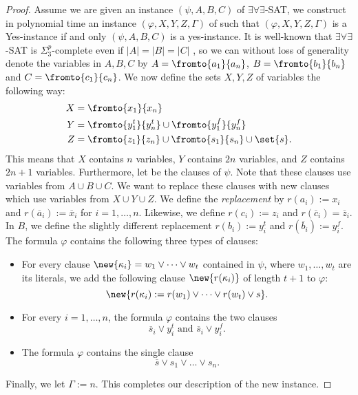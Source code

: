 \documentclass[a4paper,abstracton]{scrartcl}
\begin{document}
\begin{proof}
Assume we are given an instance $(\psi,A,B,C)$ of $\exists\forall\exists$-SAT, we construct in polynomial time an instance $(\varphi,X,Y,Z,\Gamma)$ of {\radj} such that $(\varphi,X,Y,Z,\Gamma)$ is a Yes-instance if and only  $(\psi,A,B,C)$ is a yes-instance. 
It is well-known \cite{schaefer2002completeness} that $\exists\forall\exists$-SAT is $\Sigma_3^p$-complete even if $|A| = |B| = |C|$ , so we can without loss of generality denote the variables in $A,B,C$ by $A = \fromto{a_1}{a_n}$, $B = \fromto{b_1}{b_n}$ and $C = \fromto{c_1}{c_n}$. 
We now define the sets $X,Y,Z$ of variables the following way:
\begin{align*}
X &= \fromto{x_1}{x_n}\\
Y &= \fromto{y^t_1}{y^t_n} \cup \fromto{y^f_1}{y^f_n}\\
Z &= \fromto{z_1}{z_n} \cup \fromto{s_1}{s_n} \cup \set{s}.
\end{align*}
This means that $X$ contains $n$ variables, $Y$ contains $2n$ variables, and $Z$ contains $2n+1$ variables. 
Furthermore, let  be the clauses of $\psi$.
Note that these clauses use variables from $A \cup B \cup C$. 
We want to replace these clauses with new clauses which use variables from $X \cup Y \cup Z$. 
We define the \emph{replacement}  by $r(a_i) := x_i$ and $r(\overline a_i) := \overline x_i$ for $i=1,\dots,n$. 
Likewise, we define $r(c_i) := z_i$ and $r(\overline c_i) = \overline z_i$. 
In $B$, we define the slightly different replacement $r(b_i) := y^t_i$ and $r(\overline b_i) := y^f_i$. 
The formula $\varphi$ contains the following three types of clauses: 
\begin{itemize}
\item For every clause $\new{\kappa_i} = w_1 \lor \dots \lor w_t$ contained in $\psi$, where $w_1 , \dots, w_t$ are its literals, we add the following clause $\new{r(\kappa_i)}$ of length $t+1$ to $\varphi$:
\begin{equation}
\new{r(\kappa_i) := r(w_1) \lor \dots \lor r(w_t) \lor s}. \label{clauses1}
\end{equation}
\item For every $i=1,\dots,n$, the formula $\varphi$ contains the two clauses
\begin{equation}
\overline s_i \lor y^t_i \text{ and } \overline s_i \lor y^f_i. \label{clauses2}
\end{equation}
\item The formula $\varphi$ contains the single clause 
\begin{equation}
\overline s \lor s_1 \lor \dots \lor s_n. \label{clauses3}
\end{equation}
\end{itemize}
Finally, we let $\Gamma :=  n$. This completes our description of the new instance. 


\end{proof}
\end{document}
